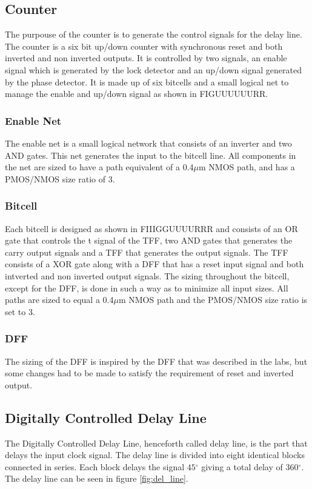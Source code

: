 \documentclass[a4paper,12pt]{article} \usepackage{graphicx}
\newcommand{\degree}{\ensuremath{^\circ}}
\begin{document}
\subsection{Counter}
The purpouse of the counter is to generate the control signals for the delay line.
The counter is a six bit up/down counter with synchronous reset and both
inverted and non inverted outputs. It is controlled by two signals, an enable
signal which is generated by the lock detector and an up/down signal generated
by the phase detector. It is made up of six bitcells and a small logical net to
manage the enable and up/down signal as shown in FIGUUUUUURR.
\subsubsection{Enable Net}
The enable net is a small logical network that consists of an inverter and two
AND gates. This net generates the input to the bitcell line.
All components in the net are sized to have a path equivalent of a 0.4$\mu$m NMOS
path, and has a PMOS/NMOS size ratio of 3.
\subsubsection{Bitcell}
Each bitcell is designed as shown in FIIIGGUUUURRR and consists of an OR gate 
that controls the t signal of the TFF, two AND gates that generates the carry 
output signals and a TFF that generates the output signals.
The TFF consists of a XOR gate along with a DFF that has a reset input signal and
both intverted and non inverted output signals.
The sizing throughout the bitcell, except for the DFF, is done in such a way as 
to minimize all input sizes. All paths are sized to equal a 0.4$\mu$m NMOS path
and the PMOS/NMOS size ratio is set to 3.
\subsubsection{DFF}
The sizing of the DFF is inspired by the DFF that was described in the labs, but
some changes had to be made to satisfy the requirement of reset and inverted output.
\subsection{Digitally Controlled Delay Line}
The Digitally Controlled Delay Line, henceforth called delay line, is the part
that delays the input clock signal. The delay line is divided into eight
identical blocks connected in series. Each block delays
the signal 
$45\degree$ giving a total delay of 360\degree. The delay line can be seen in
figure \ref{fig:del_line}. 
\end{document}
